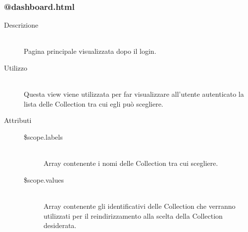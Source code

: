 \subsubsection{@dashboard.html}
\begin{description}
	\item[Descrizione] \hfill \\
	Pagina principale visualizzata dopo il login.
	\item[Utilizzo] \hfill \\
	Questa view viene utilizzata per far visualizzare all'utente autenticato la lista delle Collection tra cui egli può scegliere.
	\item[Attributi] \hfill
	\begin{description}
		\item[\$scope.labels] \hfill \\
		Array contenente i nomi delle Collection tra cui scegliere.
		\item[\$scope.values] \hfill \\
		Array contenente gli identificativi delle Collection che verranno utilizzati per il reindirizzamento alla scelta della Collection desiderata.
		
	\end{description}
 	
\end{description}

